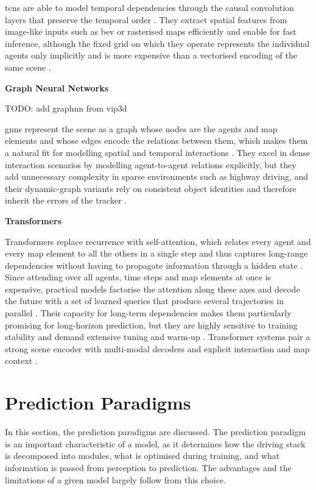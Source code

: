 \Acp{tcn} are able to model temporal dependencies through the
causal convolution layers that preserve the temporal order \cite{Nikhil2019CNN}. They extract spatial
features from image-like inputs such as \ac{bev} or rasterised maps efficiently and enable for fast inference, 
although the fixed grid on which they operate represents the individual agents only implicitly and is more
expensive than a vectorised encoding of the same scene \cite{Liu2021DLSurvey}.

\textbf{Graph Neural Networks}

TODO: add graphnn from vip3d

\Acp{gnn} represent the scene as a graph whose nodes are the agents and map elements
and whose edges encode the relations between them, which makes them a natural fit for
modelling spatial and temporal interactions \cite{Wang2021GraphTCN}. They excel in dense interaction
scenarios by modelling agent-to-agent relations explicitly, but they add unnecessary complexity in sparse
environments such as highway driving, and their dynamic-graph variants rely on consistent object identities
and therefore inherit the errors of the tracker \cite{madjid2025survey}.

\textbf{Transformers}

Transformers replace recurrence with self-attention, which relates every agent and every map element to
all the others in a single step and thus captures long-range dependencies without having to propagate
information through a hidden state \cite{Liu2021mmTransformer}. Since attending over all agents, time steps
and map elements at once is expensive, practical models factorise the attention along these axes and decode
the future with a set of learned queries that produce several trajectories in parallel
\cite{Wayformer2022}. Their capacity for long-term dependencies makes them particularly promising for
long-horizon prediction, but they are highly sensitive to training stability
and demand extensive tuning and warm-up \cite{madjid2025survey}.
Transformer systems pair a strong scene encoder with multi-modal decoders and explicit
interaction and map context \cite{Liu2021mmTransformer,Ngiam2021SceneTransformer}.

\section{Prediction Paradigms}
\label{sec:sota-paradigms}
In this section, the prediction paradigms are discussed. The prediction paradigm is an important characteristic of a model, as it determines how the
driving stack is decomposed into modules, what is optimised during training, and what
information is passed from perception to prediction. The advantages and the limitations of a given model
largely follow from this choice.


